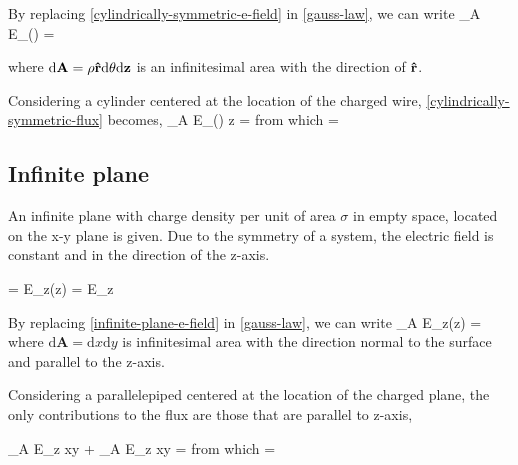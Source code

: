 By replacing \ref{cylindrically-symmetric-e-field} in \ref{gauss-law}, we can write
\be\label{cylindrically-symmetric-flux}
\oiint_A E_{\rho}(\rho) \cdot {} \cdot {} =
\ee

where $\mathrm{d}\mathbf{A} =  \rho\boldsymbol{\hat{\textbf{$\mathrm r$}}}\mathrm{d}\mathbf{\theta} \mathrm{d}\mathbf{z}$ is an infinitesimal area with the direction of $\boldsymbol{\hat{\textbf{$\mathrm r$}}}$.

Considering a cylinder centered at the location of the charged wire, \ref{cylindrically-symmetric-flux} becomes,
\be\label{cylindrically-symmetric-flux-2}
\oiint_A E_{\rho}(\rho) \cdot \rho {}\theta{}z \cdot{} =
\ee
from which
\be
{}=
\ee



\subsection{Infinite plane}
An infinite plane with charge density per unit of area $\sigma$ in empty space, located on the x-y plane is given. Due to the symmetry of a system, the electric field is constant and in the direction of the z-axis.


\be\label{infinite-plane-e-field}
 = E_{z}(z) \cdot {} = E_z \cdot {}
\ee

By replacing \ref{infinite-plane-e-field} in \ref{gauss-law}, we can write
\be\label{infinite-plane-flux}
\oiint_A E_{z}(z) \cdot {} \cdot {} =
\ee
where $\mathrm{d}\mathbf{A} = \mathrm{d}x \mathrm{d}y$ is infinitesimal area with the direction normal to the surface and parallel to the z-axis.

Considering a parallelepiped centered at the location of the charged plane, the only contributions to the flux are those that are parallel to z-axis,


\be\label{}
\oiint_A E_z \cdot {} \cdot {}xy + \oiint_A E_z \cdot {} \cdot {}xy = 
\ee
from which
\be
{}= \cdot {} 
\ee
